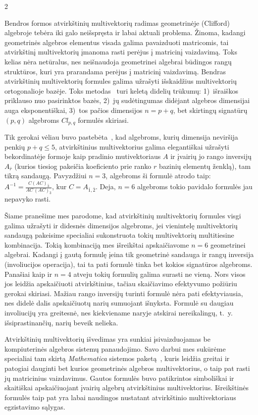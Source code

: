 \documentclass[a4paper,10pt,lithuanian]{article}
\begin{document}
\begin{multicols*}{2}

Bendros formos atvirkštinių multivektorių radimas geometrinėje (Clifford) algebroje tebėra iki galo neišspręsta ir labai aktuali problema. Žinoma, kadangi geometrinės algebros elementus visada galima pavaizduoti matricomis, tai atvirkštinį multivektorių įmanoma rasti perėjus į matricinį vaizdavimą. Toks kelias nėra netūralus, nes neišnaudoja geometrinei algebrai būdingos rangų struktūros, kuri yra prarandama perėjus į matricinį vaizdavimą.  
Bendras atvirkštinių multivektorių formules galima užrašyti išskaidžius multivektorių ortogonalioje bazėje. Toks metodas~\cite{key-1} turi keletą didelių trūkumų: 1)~išraiškos priklauso nuo pasirinktos bazės, 2)~jų sudėtingumas didėjant algebros dimensijai auga eksponentiškai, 3)~tos pačios dimensijos $n=p+q$, bet skirtingų signatūrų $(p,q)$ algebroms $Cl_{p,q}$ formulės skiriasi. 

Tik gerokai vėliau buvo pastebėta~\cite{key-2}, kad algebroms, kurių dimensija neviršija penkių  $p+q\le 5$, atvirkštinius multivektorius galima elegantiškai užrašyti bekordinatėje formoje kaip pradinio mutivektoriaus $A$ ir įvairių jo rango inversijų $A_{\bar r}$ (kurios tiesiog pakeičia koeficiento prie ranko $r$ bazinių elementų ženklą), tam tikrą sandaugą. Pavyzdžiui $n=3$,  algebroms  ši formulė atrodo taip: $A^{-1}=\frac{C(AC)_{\bar{3}}}{AC\,(AC)_{\bar{3}}}$, kur $C=A_{\bar{1},\bar{2}}$. 
Deja, $n=6$ algebroms tokio pavidalo formulės jau nepavyko rasti. 

Šiame pranešime mes parodome, kad atvirkštinių multivektorių formules visgi galima užrašyti ir didesnės dimensijos algebroms, jei vienintelę multivektorių sandaugą pakeisime specialiai sukonstruota tokių multivektorių multitiesine kombinacija. Tokią kombinaciją mes išreikštai apskaičiavome $n=6$ geometrinei algebrai. Kadangi į gautą formulę įeina tik geometrinė sandauga ir rangų inversija (involiucijos operacija), tai ta pati formulė tinka bet kokios signatūros algebroms. Panašiai kaip ir $n=4$ atveju tokių formulių galima surasti ne vieną. Nors visos jos leidžia apskaičiuoti atvirkštinius, tačiau skaičiavimo efektyvumo požiūriu gerokai skiriasi. Mažiau rango inversijų turinti formulė nėra pati efektyviausia, nes didelė dalis apskaičiuotų narių sumuojant išnyksta. Formulė su daugiau involiucijų yra greitesnė, nes kiekviename naryje atskirai nereikalingų, t.~y. išsiprastinančių, narių beveik nelieka. 

Atvirkštinių multivektorių išvedimas yra sunkiai įsivaizduojamas be kompiuterinės algebros sistemų panaudojimo. Savo darbui mes sukūrėme specialiai tam skirtą {\it Mathematica} sistemos paketą~\cite{key-3}, kuris leidžia greitai ir patogiai dauginti bet kurios geometrinės algebros multivektorius, o taip pat rasti jų matricinius vaizdavimus. Gautos formulės buvo patikrintos  simboliškai ir skaitiškai apskaičiuojant įvairių algebrų atvirkštinius multivektorius. Išreikštinės formulės taip pat yra labai naudingos nustatant atvirkštinio multivektoriaus egzistavimo sąlygas.


\end{multicols*}
\end{document}
